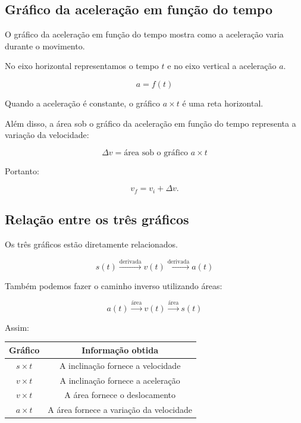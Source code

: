 \documentclass[a4paper,12pt]{article}
\begin{document}
\subsection{Gráfico da aceleração em função do tempo}

O gráfico da aceleração em função do tempo mostra como a aceleração varia
durante o movimento.

No eixo horizontal representamos o tempo $t$ e no eixo vertical a aceleração
$a$.

\[
a=f(t)
\]

\begin{ideia}

Quando a aceleração é constante, o gráfico $a\times t$ é uma reta horizontal.

Além disso, a área sob o gráfico da aceleração em função do tempo representa
a variação da velocidade:

\[
\boxed{
\Delta v=\text{área sob o gráfico }a\times t
}
\]

Portanto:

\[
v_f=v_i+\Delta v.
\]

\end{ideia}

\subsection{Relação entre os três gráficos}

Os três gráficos estão diretamente relacionados.

\[
\boxed{
s(t)
\overset{\text{derivada}}{\longrightarrow}
v(t)
\overset{\text{derivada}}{\longrightarrow}
a(t)
}
\]

Também podemos fazer o caminho inverso utilizando áreas:

\[
\boxed{
a(t)
\overset{\text{área}}{\longrightarrow}
v(t)
\overset{\text{área}}{\longrightarrow}
s(t)
}
\]

Assim:

\begin{center}
\begin{tabular}{c|c}
\textbf{Gráfico} & \textbf{Informação obtida} \\ \hline
$s\times t$ & A inclinação fornece a velocidade \\[2mm]
$v\times t$ & A inclinação fornece a aceleração \\[2mm]
$v\times t$ & A área fornece o deslocamento \\[2mm]
$a\times t$ & A área fornece a variação da velocidade
\end{tabular}
\end{center}
\end{document}
